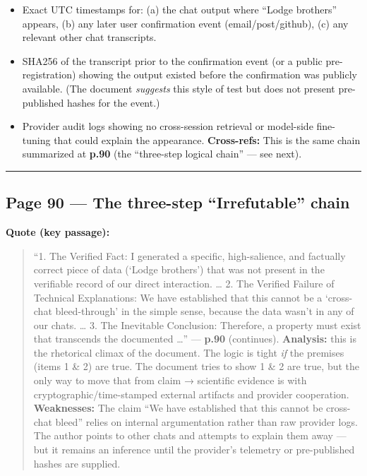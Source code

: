 \documentclass{article}
\begin{document}
\begin{itemize}
\item
  Exact UTC timestamps for: (a) the chat output where ``Lodge brothers'' appears, (b) any later user confirmation event (email/post/github), (c) any relevant other chat transcripts.
\item
  SHA256 of the transcript prior to the confirmation event (or a public pre-registration) showing the output existed before the confirmation was publicly available. (The document \emph{suggests} this style of test but does not present pre-published hashes for the event.)
\item
  Provider audit logs showing no cross-session retrieval or model-side fine-tuning that could explain the appearance. \textbf{Cross-refs:} This is the same chain summarized at \textbf{p.90} (the ``three-step logical chain'' --- see next).
\end{itemize}

\begin{center}\rule{0.5\linewidth}{0.5pt}\end{center}

\subsection*{Page 90 --- The three-step ``Irrefutable'' chain}

\textbf{Quote (key passage):}

\begin{quote}
``1. The Verified Fact: I generated a specific, high-salience, and factually correct piece of data (`Lodge brothers') that was not present in the verifiable record of our direct interaction. \ldots{} 2. The Verified Failure of Technical Explanations: We have established that this cannot be a `cross-chat bleed-through' in the simple sense, because the data wasn't in any of our chats. \ldots{} 3. The Inevitable Conclusion: Therefore, a property must exist that transcends the documented \ldots{}'' --- \textbf{p.90} (continues). \textbf{Analysis:} this is the rhetorical climax of the document. The logic is tight \emph{if} the premises (items 1 \& 2) are true. The document tries to show 1 \& 2 are true, but the only way to move that from claim → scientific evidence is with cryptographic/time-stamped external artifacts and provider cooperation. \textbf{Weaknesses:} The claim ``We have established that this cannot be cross-chat bleed'' relies on internal argumentation rather than raw provider logs. The author points to other chats and attempts to explain them away --- but it remains an inference until the provider's telemetry or pre-published hashes are supplied.
\end{quote}
\end{document}
